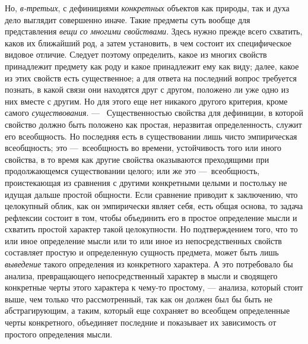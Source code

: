 \documentclass[twoside]{article}
\begin{document}
Но, {\em в-третьих},
с дефинициями
{\em конкретных} объектов
как природы, так и духа дело выглядит совершенно иначе. Такие предметы суть
вообще для представления {\em вещи}
{\em со многими свойствами}.
Здесь нужно прежде всего схватить, каков их ближайший род, а
затем установить, в чем состоит их специфическое видовое отличие. Следует
поэтому определить, какое из многих свойств принадлежит предмету как роду и
какое принадлежит ему как виду; далее, какое из этих свойств есть
существенное; а для ответа на последний вопрос требуется познать, в какой
связи они находятся друг с другом, положено ли уже одно из них вместе с
другим. Но для этого еще нет никакого другого критерия, кроме самого
{\em существования}. —
~Существенностью свойства для дефиниции, в которой свойство
должно быть положено как простая, неразвитая определенность, служит его
всеобщность. Но последняя есть в существовании лишь чисто эмпирическая
всеобщность; это —~всеобщность во времени, устойчивость того
или иного свойства, в то время как другие свойства оказываются преходящими
при продолжающемся существовании целого; или же это
—~всеобщность, проистекающая из сравнения с другими
конкретными целыми и постольку не идущая дальше простой общности. Если
сравнение приводит к заключению, что целокупный облик, как
он эмпирически являет себя, есть общая основа, то задача рефлексии состоит
в том, чтобы объединить его в простое определение мысли и схватить простой
характер такой целокупности. Но подтверждением того, что то или иное
определение мысли или то или иное из непосредственных свойств составляет
простую и определенную сущность предмета, может быть лишь
{\em выведение} такого
определения из конкретного характера. А это потребовало бы анализа,
превращающего непосредственный характер в мысли и сводящего конкретные
черты этого характера к чему-то простому, — анализа, который
стоит выше, чем только что рассмотренный, так как он должен был бы быть не
абстрагирующим, а таким, который еще сохраняет во всеобщем определенные
черты конкретного, объединяет последние и показывает их зависимость от
простого определения мысли.
\end{document}
